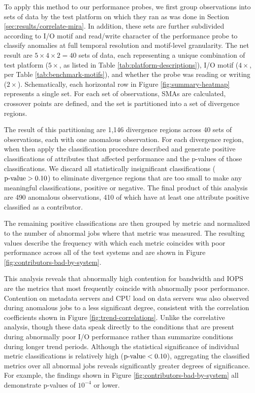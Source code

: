 To apply this method to our performance probes, we first group observations into sets of data by the test platform on which they ran as was done in Section \ref{sec:results/correlate-mira}.
In addition, these sets are further subdivided according to I/O motif and read/write character of the performance probe to classify anomalies at full temporal resolution and motif-level granularity.
The net result are $5 \times 4 \times 2 = 40$ sets of data, each representing a unique combination of test platform ($5 \times$, as listed in Table \ref{tab:platform-descriptions}), I/O motif ($4 \times$, per Table \ref{tab:benchmark-motifs}), and whether the probe was reading or writing ($2 \times$).
Schematically, each horizontal row in Figure \ref{fig:summary-heatmap} represents a single set.
For each set of observations, SMAs are calculated, crossover points are defined, and the set is partitioned into a set of divergence regions.

The result of this partitioning are 1,146 divergence regions across 40 sets of observations, each with one anomalous observation.
For each divergence region, when then apply the classification procedure described and generate positive classifications of attributes that affected performance and the p-values of those classifications.
We discard all statistically insignificant classifications ($\textup{p-value} > 0.10$) to eliminate divergence regions that are too small to make any meaningful classifications, positive or negative.
The final product of this analysis are 490 anomalous observations, 410 of which have at least one attribute positive classified as a contributor.

The remaining positive classifications are then grouped by metric and normalized to the number of abnormal jobs where that metric was measured.
The resulting values describe the frequency with which each metric coincides with poor performance across all of the test systems and are shown in Figure \ref{fig:contributors-bad-by-system}.

This analysis reveals that abnormally high contention for bandwidth and IOPS are the metrics that most frequently coincide with abnormally poor performance.
Contention on metadata servers and CPU load on data servers was also observed during anomalous jobs to a less significant degree, consistent with the correlation coefficients shown in Figure \ref{fig:trend-correlations}.
Unlike the correlative analysis, though these data speak directly to the conditions that are present during abnormally poor I/O performance rather than summarize conditions during longer trend periods.
Although the statistical significance of individual metric classifications is relatively high (${\textup{p-value} < 0.10}$), aggregating the classified metrics over all abnormal jobs reveals significantly greater degrees of significance.
For example, the findings shown in Figure \ref{fig:contributors-bad-by-system} all demonstrate p-values of $10^{-4}$ or lower.





